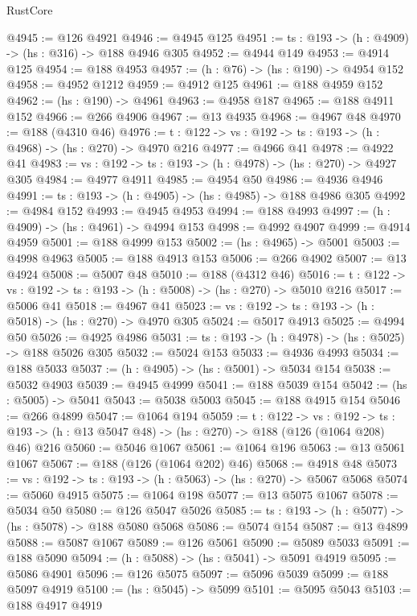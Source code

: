 \begin{lexlean}{RustCore}
\begin{coremodule}
@4945 := @126 @4921
@4946 := @4945 @125
@4951 := {ts : @193} -> (h : @4909) -> (hs : @316) -> @188 @4946 @305
@4952 := @4944 @149
@4953 := @4914 @125
@4954 := @188 @4953
@4957 := (h : @76) -> (hs : @190) -> @4954 @152
@4958 := @4952 @1212
@4959 := @4912 @125
@4961 := @188 @4959 @152
@4962 := (hs : @190) -> @4961
@4963 := @4958 @187
@4965 := @188 @4911 @152
@4966 := @266 @4906
@4967 := @13 @4935
@4968 := @4967 @48
@4970 := @188 (@4310 @46)
@4976 := {t : @122} -> {vs : @192} -> {ts : @193} -> (h : @4968) -> (hs : @270) -> @4970 @216
@4977 := @4966 @41
@4978 := @4922 @41
@4983 := {vs : @192} -> {ts : @193} -> (h : @4978) -> (hs : @270) -> @4927 @305
@4984 := @4977 @4911
@4985 := @4954 @50
@4986 := @4936 @4946
@4991 := {ts : @193} -> (h : @4905) -> (hs : @4985) -> @188 @4986 @305
@4992 := @4984 @152
@4993 := @4945 @4953
@4994 := @188 @4993
@4997 := (h : @4909) -> (hs : @4961) -> @4994 @153
@4998 := @4992 @4907
@4999 := @4914 @4959
@5001 := @188 @4999 @153
@5002 := (hs : @4965) -> @5001
@5003 := @4998 @4963
@5005 := @188 @4913 @153
@5006 := @266 @4902
@5007 := @13 @4924
@5008 := @5007 @48
@5010 := @188 (@4312 @46)
@5016 := {t : @122} -> {vs : @192} -> {ts : @193} -> (h : @5008) -> (hs : @270) -> @5010 @216
@5017 := @5006 @41
@5018 := @4967 @41
@5023 := {vs : @192} -> {ts : @193} -> (h : @5018) -> (hs : @270) -> @4970 @305
@5024 := @5017 @4913
@5025 := @4994 @50
@5026 := @4925 @4986
@5031 := {ts : @193} -> (h : @4978) -> (hs : @5025) -> @188 @5026 @305
@5032 := @5024 @153
@5033 := @4936 @4993
@5034 := @188 @5033
@5037 := (h : @4905) -> (hs : @5001) -> @5034 @154
@5038 := @5032 @4903
@5039 := @4945 @4999
@5041 := @188 @5039 @154
@5042 := (hs : @5005) -> @5041
@5043 := @5038 @5003
@5045 := @188 @4915 @154
@5046 := @266 @4899
@5047 := @1064 @194
@5059 := {t : @122} ->
  {vs : @192} ->
  {ts : @193} -> (h : @13 @5047 @48) -> (hs : @270) -> @188 (@126 (@1064 @208) @46) @216
@5060 := @5046 @1067
@5061 := @1064 @196
@5063 := @13 @5061 @1067
@5067 := @188 (@126 (@1064 @202) @46)
@5068 := @4918 @48
@5073 := {vs : @192} -> {ts : @193} -> (h : @5063) -> (hs : @270) -> @5067 @5068
@5074 := @5060 @4915
@5075 := @1064 @198
@5077 := @13 @5075 @1067
@5078 := @5034 @50
@5080 := @126 @5047 @5026
@5085 := {ts : @193} -> (h : @5077) -> (hs : @5078) -> @188 @5080 @5068
@5086 := @5074 @154
@5087 := @13 @4899
@5088 := @5087 @1067
@5089 := @126 @5061
@5090 := @5089 @5033
@5091 := @188 @5090
@5094 := (h : @5088) -> (hs : @5041) -> @5091 @4919
@5095 := @5086 @4901
@5096 := @126 @5075
@5097 := @5096 @5039
@5099 := @188 @5097 @4919
@5100 := (hs : @5045) -> @5099
@5101 := @5095 @5043
@5103 := @188 @4917 @4919

\end{coremodule}
\end{lexlean}
